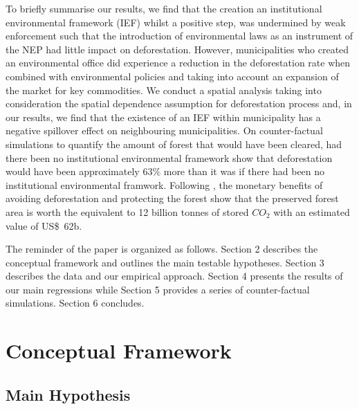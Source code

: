 To briefly summarise our results, we find that the creation an institutional environmental framework (IEF) whilst a positive step, was undermined by weak enforcement such that the introduction of environmental laws as an instrument of the NEP had little impact on deforestation. However, municipalities who created an environmental office did experience a reduction in the deforestation rate when combined with environmental policies and taking into account an expansion of the market for key commodities. We conduct a spatial analysis taking into consideration the spatial dependence assumption for deforestation process \citep{hargrave_kis-katos_2012} and, in our results, we find that the existence of an IEF within municipality has a negative spillover effect on neighbouring municipalities. On counter-factual simulations to quantify the amount of forest that would have been cleared, had there been no institutional environmental framework show that deforestation would have been approximately 63$\%$ more than it was if there had been no institutional environmental framwork. Following \citet{assuncao2015}, the monetary benefits of avoiding deforestation and protecting the forest show that the preserved forest area is worth the equivalent to 12 billion tonnes of stored $CO_{2}$ with an estimated value of US\$\ 62b.

The reminder of the paper is organized as follows.  Section 2 describes the conceptual framework and outlines the main testable hypotheses.  Section 3 describes the data and our empirical approach.  Section 4 presents the results of our main regressions while Section 5 provides a series of counter-factual simulations.  Section 6 concludes.


\section{Conceptual Framework}
\label{S:2}

\subsection{Main Hypothesis}
\label{SS:2}

